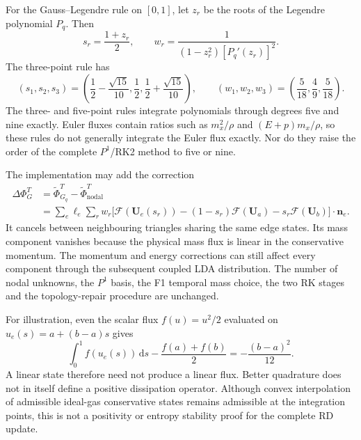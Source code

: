 For the Gauss--Legendre rule on $[0,1]$, let $z_r$ be the roots of the
Legendre polynomial $P_q$. Then
\begin{equation}
 s_r=\frac{1+z_r}{2},\qquad
 w_r=\frac{1}{(1-z_r^2)[P_q'(z_r)]^2}.
\end{equation}
The three-point rule has
\begin{equation}
 (s_1,s_2,s_3)=\left(\frac12-\frac{\sqrt{15}}{10},\frac12,
                          \frac12+\frac{\sqrt{15}}{10}\right),\qquad
 (w_1,w_2,w_3)=\left(\frac5{18},\frac49,\frac5{18}\right).
\end{equation}
The three- and five-point rules integrate polynomials through degrees five
and nine exactly. Euler fluxes contain ratios such as $m_x^2/\rho$ and
$(E+p)m_x/\rho$, so these rules do not generally integrate the Euler flux
exactly. Nor do they raise the order of the complete $P^1$/RK2 method to
five or nine.

The implementation may add the correction
\begin{align}
 \Delta\Phi_G^T
 &=\widetilde\Phi_{G_q}^T-\widetilde\Phi_{\mathrm{nodal}}^T\nonumber\\
 &=\sum_e\ell_e\sum_rw_r\Big[
 \boldsymbol{\mathcal F}(\mathbf U_e(s_r))
 -(1-s_r)\boldsymbol{\mathcal F}(\mathbf U_a)
 -s_r\boldsymbol{\mathcal F}(\mathbf U_b)\Big]\cdot\mathbf n_e.
 \label{eq:ALE_RD_Gauss_correction}
\end{align}
It cancels between neighbouring triangles sharing the same edge states.
Its mass component vanishes because the physical mass flux is linear in
the conservative momentum. The momentum and energy corrections can still
affect every component through the subsequent coupled LDA distribution.
The number of nodal unknowns, the $P^1$ basis, the F1 temporal mass choice,
the two RK stages and the topology-repair procedure are unchanged.

For illustration, even the scalar flux $f(u)=u^2/2$ evaluated on
$u_e(s)=a+(b-a)s$ gives
\begin{equation}
 \int_0^1f(u_e(s))\,\mathrm ds-\frac{f(a)+f(b)}2
 =-\frac{(b-a)^2}{12}.
\end{equation}
A linear state therefore need not produce a linear flux. Better quadrature
does not in itself define a positive dissipation operator. Although convex
interpolation of admissible ideal-gas conservative states remains
admissible at the integration points, this is not a positivity or entropy
stability proof for the complete RD update.

